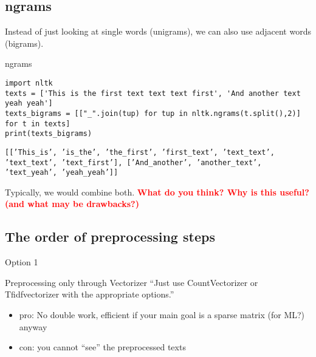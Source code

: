 \subsection{ngrams}
\begin{frame}
	Instead of just looking at single words (unigrams), we can also use adjacent words (bigrams).
\end{frame}

\begin{frame}[fragile]{ngrams}
	\begin{lstlisting}
import nltk
texts = ['This is the first text text text first', 'And another text yeah yeah']
texts_bigrams = [["_".join(tup) for tup in nltk.ngrams(t.split(),2)] for t in texts]
print(texts_bigrams)
	\end{lstlisting}
	\texttt{[['This\_is',
		'is\_the',
		'the\_first',
		'first\_text',
		'text\_text',
		'text\_text',
		'text\_first'],
		['And\_another', 'another\_text', 'text\_yeah', 'yeah\_yeah']]
	}
	
	Typically, we would combine both.
	\pause
	\textbf{\textcolor{red}{What do you think? Why is this useful? (and what may be drawbacks?)}}
\end{frame}



\subsection{The order of preprocessing steps}

\begin{frame}{Option 1}
\begin{block}{Preprocessing only through Vectorizer}
``Just use CountVectorizer or Tfidfvectorizer with the appropriate options.''	
\begin{itemize}
	\item pro: No double work, efficient if your main goal is a sparse matrix (for ML?) anyway
	\item con: you cannot ``see'' the preprocessed texts
\end{itemize}
\end{block}
\end{frame}

